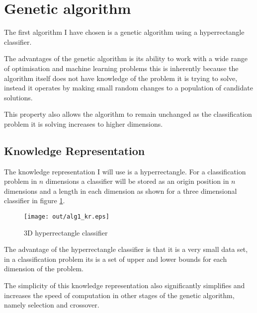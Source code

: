 \documentclass[a4paper]{article}
\title{\DOCTITLE}
\author{\DOCAUTHOR}
\date{\DOCDATE}
\begin{document}
\maketitle

\begin{abstract}
  This document describes the choices I have made for the two bio inspired
  algorithms, their parameters and knowledge representation that will be used to
  solve the given classification problem.
\end{abstract}

\section{Genetic algorithm}

The first algorithm I have chosen is a genetic algorithm using a hyperrectangle
classifier.

The advantages of the genetic algorithm is its ability to work with a wide range
of optimisation and machine learning problems this is inherently because the
algorithm itself does not have knowledge of the problem it is trying to solve,
instead it operates by making small random changes to a population of candidate
solutions.

This property also allows the algorithm to remain unchanged as the
classification problem it is solving increases to higher dimensions.

\subsection{Knowledge Representation}

The knowledge representation I will use is a hyperrectangle. For a
classification problem in $n$ dimensions a classifier will be stored as an
origin position in $n$ dimensions and a length in each dimension as shown for a
three dimensional classifier in figure \ref{fig:alg1_kr}.

\begin{figure}[h!]
  \centering
  \texttt{[image: out/alg1\_kr.eps]}
  \caption{3D hyperrectangle classifier}
  \label{fig:alg1_kr}
\end{figure}

The advantage of the hyperrectangle classifier is that it is a very small data
set, in a classification problem its is a set of upper and lower bounds for each
dimension of the problem.

The simplicity of this knowledge representation also significantly simplifies
and increases the speed of computation in other stages of the genetic algorithm,
namely selection and crossover.
\end{document}
